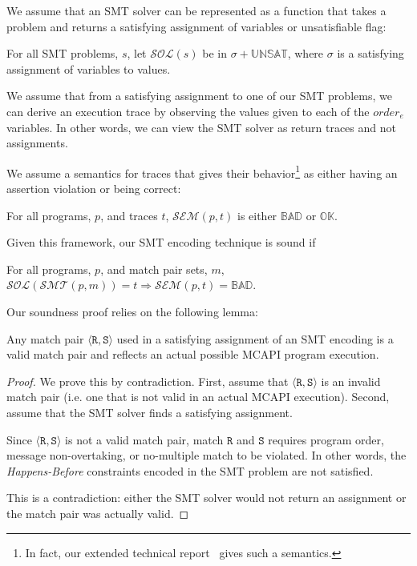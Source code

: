 We assume that an SMT solver can be represented as a function that
takes a problem and returns a satisfying assignment of variables or
unsatisfiable flag:

\begin{definition}
For all SMT problems, $s$, let $\mathcal{SOL}(s)$ be in $\sigma +
\mathbb{UNSAT}$, where $\sigma$ is a satisfying assignment of
variables to values.
\end{definition}

We assume that from a satisfying assignment to one of our SMT
problems, we can derive an execution trace by observing the values
given to each of the $\textit{order}_{e}$ variables. In other words,
we can view the SMT solver as return traces and not assignments.

We assume a semantics for traces that gives their behavior\footnote{In
  fact, our extended technical report~\cite{extended-version} gives
  such a semantics.} as either having an assertion violation or being
correct:

\begin{definition}[Semantics]
For all programs, $p$, and traces $t$, $\mathcal{SEM}(p, t)$ is either
$\mathbb{BAD}$ or $\mathbb{OK}$.
\end{definition}

Given this framework, our SMT encoding technique is sound if

\begin{theorem}[Soundness]
For all programs, $p$, and match pair sets, $m$,
$\mathcal{SOL}(\mathcal{SMT}(p, m)) = t \Rightarrow \mathcal{SEM}(p, t) =
\mathbb{BAD}$.
\end{theorem}

Our soundness proof relies on the following lemma:

\begin{lemma} \label{lem:bogus}
Any match pair $\langle \mathtt{R}, \mathtt{S}\rangle$ used in a
satisfying assignment of an SMT encoding is a valid match pair and
reflects an actual possible MCAPI program execution.
\end{lemma}
\begin{proof}
We prove this by contradiction. First, assume that $\langle
\mathtt{R}, \mathtt{S}\rangle$ is an invalid match pair (i.e. one that
is not valid in an actual MCAPI execution). Second, assume that the
SMT solver finds a satisfying assignment.

Since $\langle \mathtt{R}, \mathtt{S}\rangle$ is not a valid match
pair, match $\mathtt{R}$ and $\mathtt{S}$ requires program order,
message non-overtaking, or no-multiple match to be violated. In other
words, the \emph{Happens-Before} constraints encoded in the SMT
problem are not satisfied. 

This is a contradiction: either the SMT solver would not return an
assignment or the match pair was actually valid.
\end{proof}

